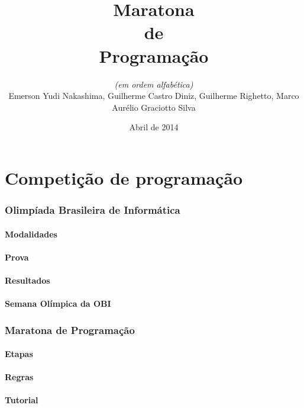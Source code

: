 \documentclass[utf8, usepdftitle=false, svgnames, color={table, fixpdftex, hyperref, fixinclude, xcdraw}, t, brazil]{beamer}
\title{Maratona\\de\\Programação}
\author[UTFPR-CM]{\textit{(em ordem alfabética)}\\Emerson Yudi Nakashima, Guilherme Castro Diniz, Guilherme Righetto, Marco Aurélio Graciotto Silva}
\date[]{Abril de 2014}
\begin{document}
	\frontmatter{}
	

	\part{Competição de programação}

		\section[OBI]{Olimpíada Brasileira de Informática}
		

			\subsection{Modalidades}
			

			\subsection{Prova}
			

			\subsection{Resultados}
			

			\subsection{Semana Olímpica da OBI}
			



		\section[ICPC]{Maratona de Programação}
		

			\subsection{Etapas}
			

			\subsection{Regras}
			

			\subsection{Tutorial}
			
\end{document}

